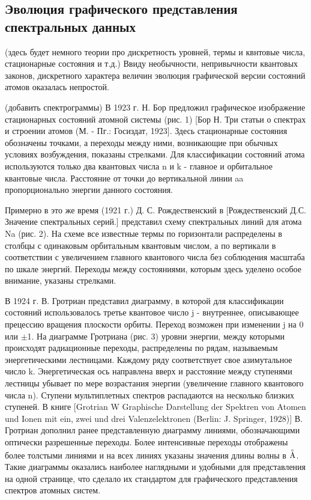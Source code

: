 \documentclass[a4paper, 12pt]{article}
\begin{document}
    \subsection{Эволюция графического представления спектральных данных}
    (здесь будет немного теории про дискретность уровней, термы и квнтовые числа, стационарные состояния и т.д.)
    Ввиду необычности, непривычности квантовых законов, дискретного характера величин эволюция графической версии состояний атомов оказалась непростой.\par
    (добавить спектрограммы)
    В 1923 г. Н. Бор предложил графическое изображение стационарных состояний атомной системы (рис. 1) [Бор Н. Три статьи о спектрах и строении атомов (М. - Пг.: Госиздат, 1923]. Здесь стационарные состояния обозначены точками, а переходы между ними, возникающие при обычных условиях возбуждения, показаны стрелками. Для классификации состояний атома используются только два квантовых числа n и k - главное и орбитальное квантовые числа. Расстояние от точки до вертикальной линии aa пропорционально энергии данного состояния.\par
    Примерно в это же время (1921 г.) Д. С. Рождественский в [Рождественский Д.С. Значение спектральных серий.] представил схему спектральных линий для атома Na (рис. 2). На схеме все известные термы по горизонтали распределены в столбцы с одинаковым орбитальным квантовым числом, а по вертикали в соответствии с увеличением главного квантового числа без соблюдения масштаба по шкале энергий. Переходы между состояниями, которым здесь уделено особое внимание, указаны стрелками.\par
    В 1924 г. В. Гротриан представил диаграмму, в которой для классификации состояний использовалось третье квантовое число j - внутреннее, описывающее прецессию вращения плоскости орбиты. Переход возможен при изменении j на 0 или $\pm$1. На диаграмме Гротриана (рис. 3) уровни энергии, между которыми происходят радиационные переходы, распределены по рядам, называемым энергетическими лестницами. Каждому ряду соответствует свое азимутальное число k. Энергетическая ось направлена вверх и расстояние между ступенями лестницы убывает по мере возрастания энергии (увеличение главного квантового числа n). Ступени мультиплетных спектров распадаются на несколько близких ступеней. В книге [Grotrian W Graphische Darstellung der Spektren von Atomen und Ionen mit ein, zwei und drei Valenzelektronen (Berlin: J. Springer, 1928)] В. Гротриан дополнил ранее представленную диаграмму линиями, обозначающими оптически разрешенные переходы. Более интенсивные переходы отображены более толстыми линиями и на всех линиях указаны значения длины волны в ${\buildrel _{\circ} \over {\mathrm{A}}}$. Такие диаграммы оказались наиболее наглядными и удобными для представления на одной странице, что сделало их стандартом для графического представления спектров атомных систем.\par
\end{document}
